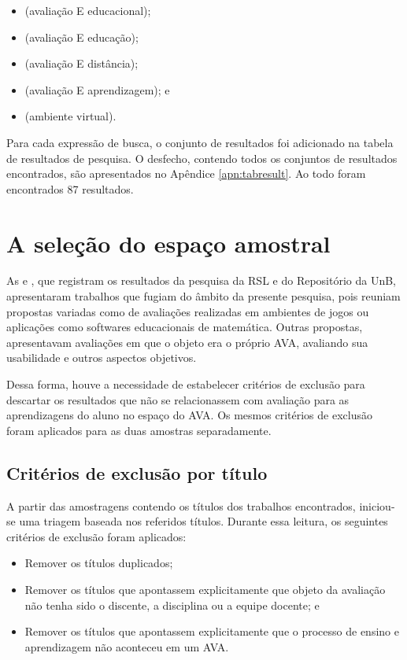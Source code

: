 \begin{itemize}
    \item (avaliação E educacional);
    \item (avaliação E educação);
    \item (avaliação E distância);
    \item (avaliação E aprendizagem); e
    \item (ambiente virtual).
\end{itemize}

Para cada expressão de busca, o conjunto de resultados foi adicionado na tabela de resultados de pesquisa. O desfecho, contendo todos os conjuntos de resultados encontrados, são apresentados no Apêndice \ref{apn:tabresult}. Ao todo foram encontrados 87 resultados.

\section{A seleção do espaço amostral}%

As  e , que registram os resultados da pesquisa da RSL e do Repositório da UnB, apresentaram trabalhos que fugiam do âmbito da presente pesquisa, pois reuniam propostas variadas como de avaliações realizadas em ambientes de jogos ou aplicações como softwares educacionais de matemática. Outras propostas, apresentavam avaliações em que o objeto era o próprio AVA, avaliando sua usabilidade e outros aspectos objetivos.

Dessa forma, houve a necessidade de estabelecer critérios de exclusão para descartar os resultados que não se relacionassem com avaliação para as aprendizagens do aluno no espaço do AVA. Os mesmos critérios de exclusão foram aplicados para as duas amostras separadamente.

\subsection{Critérios de exclusão por título}%
A partir das amostragens contendo os títulos dos trabalhos encontrados, iniciou-se uma triagem baseada nos referidos títulos. Durante essa leitura, os seguintes critérios de exclusão foram aplicados:
\begin{itemize}
    \item Remover os títulos duplicados;
    \item Remover os títulos que apontassem explicitamente que objeto da avaliação não tenha sido o discente, a disciplina ou a equipe docente; e
    \item Remover os títulos que apontassem explicitamente que o processo de ensino e aprendizagem não aconteceu em um AVA.    
\end{itemize}

